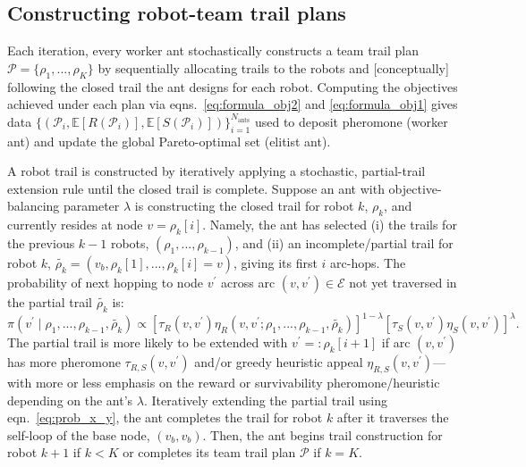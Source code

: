 \documentclass[11pt, oneside]{article}
\begin{document}
\subsection{Constructing robot-team trail plans}
Each iteration, every worker ant stochastically constructs a team trail plan $\mathcal{P}=\{\rho_1, ..., \rho_K\}$ by sequentially allocating trails to the robots and [conceptually] following the closed trail the ant designs for each robot. Computing the objectives achieved under each plan via eqns.~\ref{eq:formula_obj2} and \ref{eq:formula_obj1} gives data $\{ (\mathcal{P}_i, \mathbb{E}[R(\mathcal{P}_i)], \mathbb{E}[S(\mathcal{P}_i)])\}_{i=1}^{N_{\text{ants}}}$ used to deposit pheromone (worker ant) and update the global Pareto-optimal set (elitist ant). 

A robot trail is constructed by iteratively applying a stochastic, partial-trail extension rule until the closed trail is complete. Suppose an ant with objective-balancing parameter $\lambda$ is constructing the closed trail for robot $k$, $\rho_k$, and currently resides at node $v=\rho_k[i]$.
Namely, the ant has selected (i) the trails for the previous $k-1$ robots, $(\rho_1, ..., \rho_{k-1})$, and (ii) an incomplete/partial trail for robot $k$, $\tilde{\rho_k}=(v_b, \rho_k[1], ..., \rho_k[i]=v)$, giving its first $i$ arc-hops.
The probability of next hopping to node $v^\prime$ across arc $(v, v^\prime)\in\mathcal{E}$ not yet traversed in the partial trail $\tilde{\rho_k}$ is:
 \begin{equation}
	\pi(v^\prime \mid \rho_1, ..., \rho_{k-1}, \tilde{\rho_k}) \propto 
		 \left[\tau_R(v, v^\prime) \eta_R(v, v^\prime; \rho_1, ..., \rho_{k-1},\tilde{\rho_k}) \right]^{1-\lambda} \left[ \tau_S(v, v^\prime) \eta_S(v, v^\prime) \right]^\lambda.
	 \label{eq:prob_x_y}
\end{equation}
The partial trail is more likely to be extended with $v^\prime=:\rho_k[i+1]$ if arc $(v, v^\prime)$ has more pheromone $\tau_{R, S}(v, v^\prime)$ and/or greedy heuristic appeal $\eta_{R, S}(v, v^\prime)$---with more or less emphasis on the reward or survivability pheromone/heuristic depending on the ant's $\lambda$.
Iteratively extending the partial trail using eqn.~\ref{eq:prob_x_y}, the ant completes the trail for robot $k$ after it traverses the self-loop of the base node, $(v_b, v_b)$. Then, the ant begins trail construction for robot $k+1$ if $k<K$ or completes its team trail plan $\mathcal{P}$ if $k=K$. 
\end{document}
